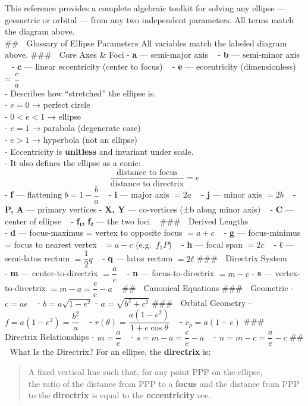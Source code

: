 \documentclass[
  letterpaper,
]{book}
\begin{document}
This reference provides a complete algebraic toolkit for solving any
ellipse --- geometric or orbital --- from any two independent
parameters. All terms match the diagram above.\\
\#\# 📘 Glossary of Ellipse Parameters All variables match the labeled
diagram above. \#\#\# 🔹 Core Axes \& Foci - \textbf{a} --- semi-major
axis ~ - \textbf{b} --- semi-minor axis ~ - \textbf{c} --- linear
eccentricity (center to focus) ~ - \textbf{e} --- eccentricity
(dimensionless) = \(\dfrac{c}{a}\)\\
- Describes how ``stretched'' the ellipse is.\\
- \(e = 0\) → perfect circle\\
- \(0 < e < 1\) → ellipse\\
- \(e = 1\) → parabola (degenerate case)\\
- \(e > 1\) → hyperbola (not an ellipse)\\
- Eccentricity is \textbf{unitless} and invariant under scale.\\
- It also defines the ellipse as a conic: \[
  \dfrac{\text{distance to focus}}{\text{distance to directrix}} = e
\] - \textbf{f} --- flattening \(b = 1 - \dfrac{b}{a}\) ~ - \textbf{i}
--- major axis \(=2a\) ~ - \textbf{j} --- minor axis \(=2b\) ~ -
\textbf{P, A} --- primary vertices - \textbf{X, Y} --- co-vertices (±b
along minor axis) ~ - \textbf{C} --- center of ellipse ~ - \textbf{f₁,
f₂} --- the two foci ~ \#\#\# 🔹 Derived Lengths\\
- \textbf{d} --- focus-maximus = vertex to opposite focus \(= a + c\) ~
- \textbf{g} --- focus-minimus = focus to nearest vertex ~\(= a - c\)
(e.g.~\(f_1P\)) ~ - \textbf{h} --- focal span \(=2c\) ~ - \textbf{ℓ} ---
semi-latus rectum \(=\dfrac{1}{2} q\) ~ - \textbf{q} --- latus rectum
\(= 2ℓ\) \#\#\# 🔹 Directrix System\\
- \textbf{m} --- center-to-directrix \(=\dfrac{a}{e}\) ~ - \textbf{n}
--- focus-to-directrix \(=m - c\) - \textbf{s} --- vertex-to-directrix
\(=m - a = \dfrac{c}{e} - a\) ~ \#\# 🧮 Canonical Equations \#\#\# 🔹
Geometric - \(c = ae\) ~ - \(b = a\sqrt{1 - e^2}\) -
\(a = \sqrt{b^2 + c^2}\) \#\#\# 🔹 Orbital Geometry -
\(f = a(1 - e^2) = \dfrac{b^2}{a}\) ~ -
\(r(\theta) = \dfrac{a(1 - e^2)}{1 + e \cos \theta}\) ~ -
\(r_p = a(1 - e)\) \#\#\# 🔹 Directrix Relationships -
\(m = \dfrac{a}{e}\) ~ - \(s = m - a = \dfrac{c}{e} - a\) ~ -
\(n = m - c = \dfrac{a}{e} - c\) \#\# 📐 What Is the Directrix? For an
ellipse, the \textbf{directrix} is:

\begin{quote}
A fixed vertical line such that, for any point PPP on the ellipse,\\
the ratio of the distance from PPP to a \textbf{focus} and the distance
from PPP to the \textbf{directrix} is equal to the \textbf{eccentricity}
eee.
\end{quote}
\end{document}
